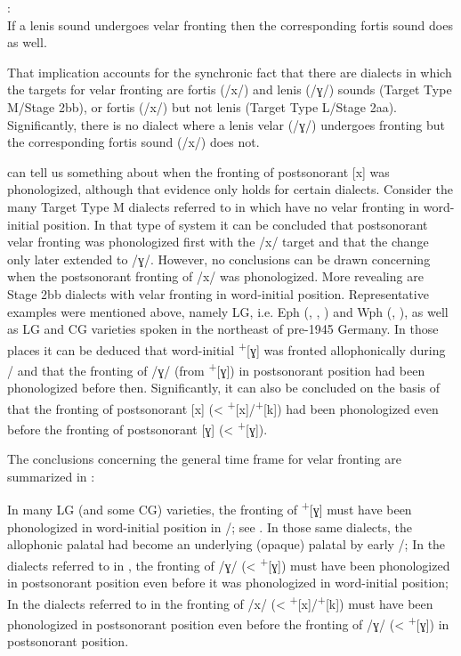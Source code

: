 \eanoraggedright%
\label{ex:16:1}
      \textsc{}:\\
      If a lenis sound undergoes velar fronting then the corresponding fortis sound does as well.
\z 

That implication accounts for the synchronic fact that there are dialects in which the targets for velar fronting are fortis (/x/) and lenis (/ɣ/) sounds (Target Type M/Stage 2bb), or fortis (/x/) but not lenis (Target Type L/Stage 2aa). Significantly, there is no dialect where a lenis velar (/ɣ/) undergoes fronting but the corresponding fortis sound (/x/) does not.

 can tell us something about when the fronting of postsonorant [x] was phonologized, although that evidence only holds for certain dialects. Consider the many Target Type M dialects referred to in  which have no velar fronting in word-initial position. In that type of system it can be concluded that postsonorant velar fronting was phonologized first with the /x/ target and that the change only later extended to /ɣ/. However, no conclusions can be drawn concerning when the postsonorant fronting of /x/ was phonologized. More revealing are Stage 2bb dialects with velar fronting in word-initial position. Representative examples were mentioned above, namely LG, i.e. Eph (, , ) and Wph (, ), as well as LG and CG varieties spoken in the northeast of pre-1945 Germany. In those places it can be deduced that word-initial  \textsuperscript{+}[ɣ] was fronted allophonically during / and that the fronting of /ɣ/ (from  \textsuperscript{+}[ɣ]) in postsonorant position had been phonologized before then. Significantly, it can also be concluded on the basis of  that the fronting of postsonorant [x] (<  \textsuperscript{+}[x]/\textsuperscript{+}[k]) had been phonologized even before the fronting of postsonorant [ɣ] (<  \textsuperscript{+}[ɣ]). 

The conclusions concerning the general time frame for velar fronting are summarized in :

\eanoraggedright\label{ex:16:2}
\eanoraggedright\label{ex:16:2a} In many LG (and some CG) varieties, the fronting of  \textsuperscript{+}[ɣ] must have been phonologized in word-initial position in /; see . In those same dialects, the allophonic palatal had become an underlying (opaque) palatal by early /;
\ex\label{ex:16:2b} In the dialects referred to in , the fronting of /ɣ/ (<  \textsuperscript{+}[ɣ]) must have been phonologized in postsonorant position even before it was phonologized in word-initial position;
\ex\label{ex:16:2c} In the dialects referred to in  the fronting of /x/ (<  \textsuperscript{+}[x]/\textsuperscript{+}[k]) must have been phonologized in postsonorant position even before the fronting of  /ɣ/ (<  \textsuperscript{+}[ɣ]) in postsonorant position.
\z 
\z 

